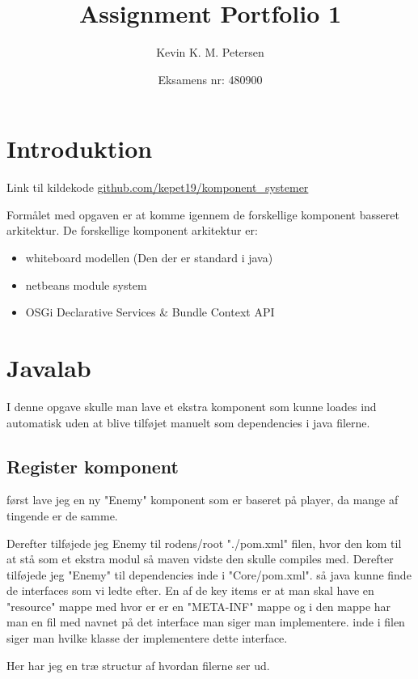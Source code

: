 \title{Assignment Portfolio 1}
\author{Kevin K. M. Petersen \and Eksamens nr: 480900}
\maketitle

\section{Introduktion}
Link til kildekode \href{https://github.com/kepet19/komponent_systemer}{github.com/kepet19/komponent\_systemer}

Formålet med opgaven er at komme igennem de forskellige komponent basseret
arkitektur. De forskellige komponent arkitektur er: 


\begin{itemize}
 \item whiteboard modellen (Den der er standard i java)
 \item netbeans module system
 \item OSGi {Declarative Services \& Bundle Context API}
\end{itemize}

\section{Javalab}
I denne opgave skulle man lave et ekstra komponent som kunne loades ind
automatisk uden at blive tilføjet manuelt som dependencies i java filerne.

\subsection{Register komponent}
først lave jeg en ny "Enemy" komponent som er baseret på player, da mange af
tingende er de samme. 

Derefter tilføjede jeg Enemy til rodens/root "./pom.xml" filen, hvor den kom
til at stå som et ekstra modul så maven vidste den skulle compiles med.
Derefter tilføjede jeg "Enemy" til dependencies inde i "Core/pom.xml". så java
kunne finde de interfaces som vi ledte efter.  En af de key items er at man
skal have en "resource" mappe med hvor er er en "META-INF" mappe og i den mappe
har man en fil med navnet på det interface man siger man implementere. inde i filen
siger man hvilke klasse der implementere dette interface.

Her har jeg en træ structur af hvordan filerne ser ud.

\hfill \linebreak \hline 
{}
\hline \hfill \linebreak

